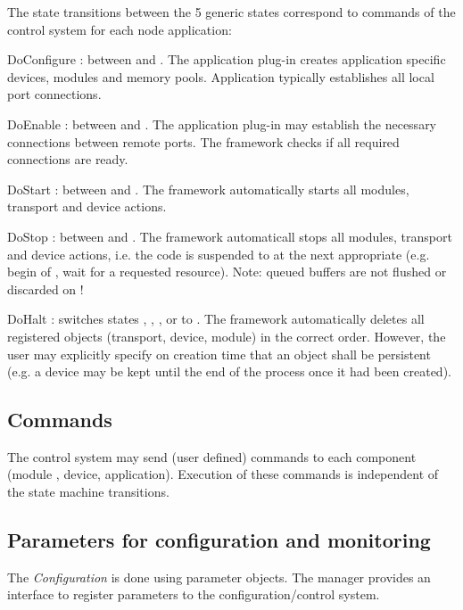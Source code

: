 The state transitions between the 5 generic states correspond to 
      commands of the control system for each node application:
\begin{compactdesc}
\item[DoConfigure] : between  and . 
    The application plug-in creates application 
	 specific devices, modules and memory pools. Application typically establishes all 
	 local port connections. 
\item[DoEnable] : between  and . 
	 The application plug-in may establish the necessary 
	 connections between remote ports. The framework checks if 
	 all required connections are ready.
\item[DoStart]  : between  and . The framework automatically 
	 starts all modules, transport and device actions.
\item[DoStop] : between  and . The framework automaticall 
	 stops all modules, transport and device actions, 
	 i.e. the code is suspended to  at the next appropriate 
	  (e.g. begin of , wait for a requested resource). 
	 Note: queued buffers are not flushed or discarded on  !
\item[DoHalt] : switches states  ,  , , or 
	  to . The framework automatically deletes all 
	 registered objects (transport, device, module) 
	 in the correct order. However, the user may explicitly specify on 
	 creation time that an object shall be persistent (e.g. a device may 
	 be kept until the end of the process once it had been created). 
\end{compactdesc}


\subsection{Commands}
The control system may send (user defined) commands to each 
   component (module , device, application). Execution of these commands is 
   independent of the state machine transitions.

\subsection{Parameters for configuration and monitoring}
The {\sl Configuration} is done using parameter objects. The 
   manager provides an interface to register parameters to the
    configuration/control system.    

